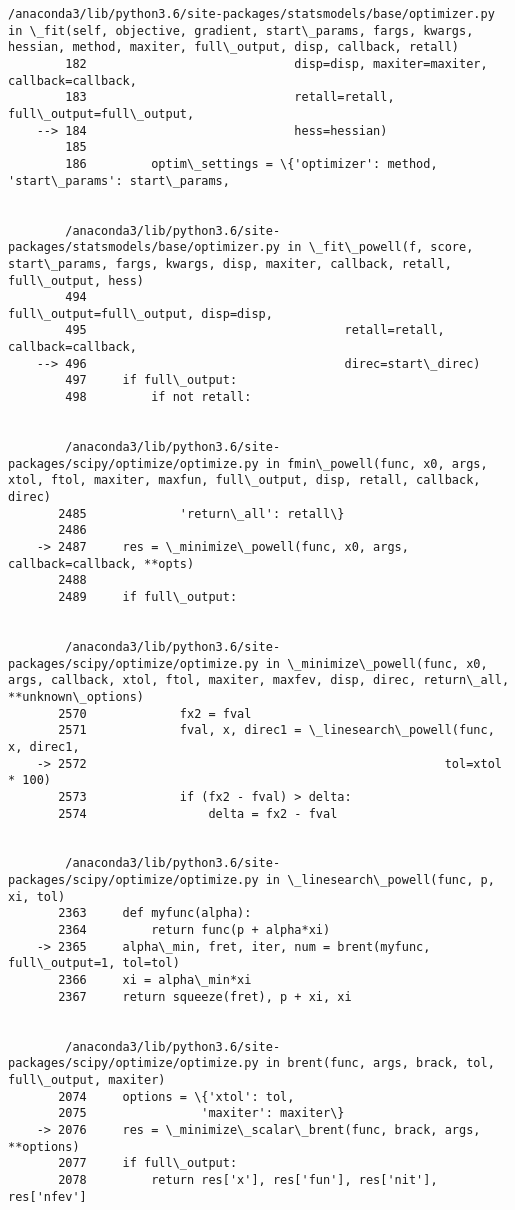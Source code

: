 \documentclass[11pt]{article}
\begin{document}
\begin{Verbatim}[commandchars=\\\{\}]
        /anaconda3/lib/python3.6/site-packages/statsmodels/base/optimizer.py in \_fit(self, objective, gradient, start\_params, fargs, kwargs, hessian, method, maxiter, full\_output, disp, callback, retall)
        182                             disp=disp, maxiter=maxiter, callback=callback,
        183                             retall=retall, full\_output=full\_output,
    --> 184                             hess=hessian)
        185 
        186         optim\_settings = \{'optimizer': method, 'start\_params': start\_params,


        /anaconda3/lib/python3.6/site-packages/statsmodels/base/optimizer.py in \_fit\_powell(f, score, start\_params, fargs, kwargs, disp, maxiter, callback, retall, full\_output, hess)
        494                                    full\_output=full\_output, disp=disp,
        495                                    retall=retall, callback=callback,
    --> 496                                    direc=start\_direc)
        497     if full\_output:
        498         if not retall:


        /anaconda3/lib/python3.6/site-packages/scipy/optimize/optimize.py in fmin\_powell(func, x0, args, xtol, ftol, maxiter, maxfun, full\_output, disp, retall, callback, direc)
       2485             'return\_all': retall\}
       2486 
    -> 2487     res = \_minimize\_powell(func, x0, args, callback=callback, **opts)
       2488 
       2489     if full\_output:


        /anaconda3/lib/python3.6/site-packages/scipy/optimize/optimize.py in \_minimize\_powell(func, x0, args, callback, xtol, ftol, maxiter, maxfev, disp, direc, return\_all, **unknown\_options)
       2570             fx2 = fval
       2571             fval, x, direc1 = \_linesearch\_powell(func, x, direc1,
    -> 2572                                                  tol=xtol * 100)
       2573             if (fx2 - fval) > delta:
       2574                 delta = fx2 - fval


        /anaconda3/lib/python3.6/site-packages/scipy/optimize/optimize.py in \_linesearch\_powell(func, p, xi, tol)
       2363     def myfunc(alpha):
       2364         return func(p + alpha*xi)
    -> 2365     alpha\_min, fret, iter, num = brent(myfunc, full\_output=1, tol=tol)
       2366     xi = alpha\_min*xi
       2367     return squeeze(fret), p + xi, xi


        /anaconda3/lib/python3.6/site-packages/scipy/optimize/optimize.py in brent(func, args, brack, tol, full\_output, maxiter)
       2074     options = \{'xtol': tol,
       2075                'maxiter': maxiter\}
    -> 2076     res = \_minimize\_scalar\_brent(func, brack, args, **options)
       2077     if full\_output:
       2078         return res['x'], res['fun'], res['nit'], res['nfev']



\end{Verbatim}
\end{document}
